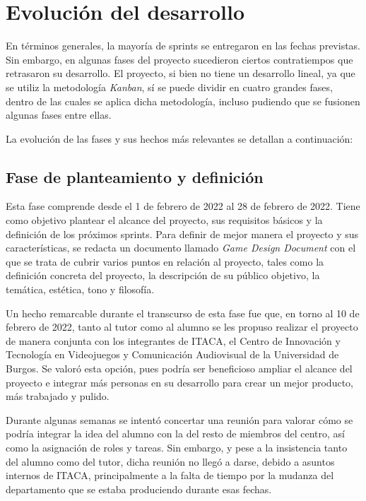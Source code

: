 \section{Evolución del desarrollo}
En términos generales, la mayoría de sprints se entregaron en las fechas previstas. Sin embargo, en algunas fases del proyecto sucedieron ciertos contratiempos que retrasaron su desarrollo. El proyecto, si bien no tiene un desarrollo lineal, ya que se utiliz la metodología \textit{Kanban}, sí se puede dividir en cuatro grandes fases, dentro de las cuales se aplica dicha metodología, incluso pudiendo que se fusionen algunas fases entre ellas.                                      

La evolución de las fases y sus hechos más relevantes se detallan a continuación:

\subsection{Fase de planteamiento y definición}
Esta fase comprende desde el 1 de febrero de 2022 al 28 de febrero de 2022. Tiene como objetivo plantear el alcance del proyecto, sus requisitos básicos y la definición de los próximos sprints. Para definir de mejor manera el proyecto y sus características, se redacta un documento llamado \textit{Game Design Document} con el que se trata de cubrir varios puntos en relación al proyecto, tales como la definición concreta del proyecto, la descripción de su público objetivo, la temática, estética, tono y filosofía.

Un hecho remarcable durante el transcurso de esta fase fue que, en torno al 10 de febrero de 2022, tanto al tutor como al alumno se les propuso realizar el proyecto de manera conjunta con los integrantes de ITACA, el Centro de Innovación y Tecnología en Videojuegos y Comunicación Audiovisual de la Universidad de Burgos. Se valoró esta opción, pues podría ser beneficioso ampliar el alcance del proyecto e integrar más personas en su desarrollo para crear un mejor producto, más trabajado y pulido.

Durante algunas semanas se intentó concertar una reunión para valorar cómo se podría integrar la idea del alumno con la del resto de miembros del centro, así como la asignación de roles y tareas. Sin embargo, y pese a la insistencia tanto del alumno como del tutor, dicha reunión no llegó a darse, debido a asuntos internos de ITACA, principalmente a la falta de tiempo por la mudanza del departamento que se estaba produciendo durante esas fechas.

